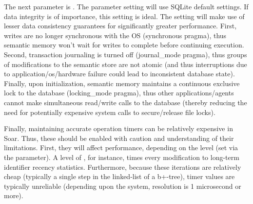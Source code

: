The next parameter is .  
The  parameter setting will use SQLite default settings.  
If data integrity is of importance, this setting is ideal.  
The  setting will make use of lesser data consistency guarantees for significantly greater performance.  
First, writes are no longer synchronous with the OS (synchronous pragma), thus semantic memory won't wait for writes to complete before continuing execution.  
Second, transaction journaling is turned off (journal\_mode pragma), thus groups of modifications to the semantic store are not atomic (and thus interruptions due to application/os/hardware failure could lead to inconsistent database state).  
Finally, upon initialization, semantic memory maintains a continuous exclusive lock to the database (locking\_mode pragma), thus other applications/agents cannot make simultaneous read/write calls to the database (thereby reducing the need for potentially expensive system calls to secure/release file locks).

Finally, maintaining accurate operation timers can be relatively expensive in Soar.  
Thus, these should be enabled with caution and understanding of their limitations.  
First, they will affect performance, depending on the level (set via the  parameter).  
A level of , for instance, times every modification to long-term identifier recency statistics.  
Furthermore, because these iterations are relatively cheap (typically a single step in the linked-list of a b+-tree), timer values are typically unreliable (depending upon the system, resolution is 1 microsecond or more).

